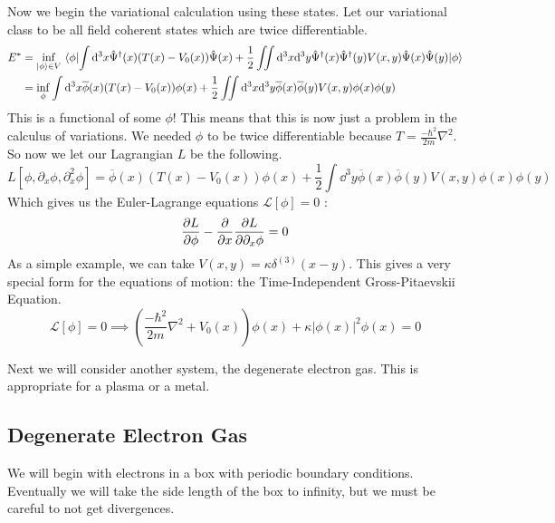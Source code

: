 \documentclass{article}
\begin{document}
Now we begin the variational calculation using these states. Let our variational class to be all field coherent states which are twice differentiable.
\begin{align}
E^* &= \inf_{\ket{\phi}\in V} \expval{\int \dd^3 x \hat\Psi^\dagger(x)(T(x)-V_0(x))\hat\Psi(x) + \frac{1}{2}\iint\dd^3 x \dd^3 y \hat\Psi^\dagger(x)\hat\Psi^\dagger(y)V(x,y)\hat\Psi(x)\hat\Psi(y)}{\phi}\\
&= \inf_{\phi}\int \dd^3 x\overline\phi(x) (T(x)-V_0(x))\phi(x)+\frac{1}{2} \iint \dd^3 x \dd^3 y \overline\phi(x)\overline\phi(y)V(x,y)\phi(x)\phi(y)
\end{align}
This is a functional of some $\phi$! This means that this is now just a problem in the calculus of variations. We needed $\phi$ to be twice differentiable because $T = \frac{-\hbar^2}{2m}\nabla^2$. So now we let our Lagrangian $L$ be the following.
\[L[\phi,\partial_x \phi, \partial_x^2 \phi] =\overline\phi(x) (T(x)-V_0(x))\phi(x)+\frac{1}{2} \int \dd^3 y \overline\phi(x)\overline\phi(y)V(x,y)\phi(x)\phi(y)\]
Which gives us the Euler-Lagrange equations $\mathcal{L}[\phi]=0$ :
\begin{equation}
\pdv{L}{\phi}-\pdv{x}\pdv{L}{\partial_x\phi} = 0
\end{equation}
As a simple example, we can take $V(x,y) = \kappa \delta^{(3)}(x-y)$. This gives a very special form for the equations of motion: the Time-Independent Gross-Pitaevskii Equation.
\begin{equation}
\mathcal{L}[\phi]=0\implies \left(\frac{-\hbar^2}{2m}\nabla^2 + V_0(x)\right)\phi(x) + \kappa|\phi(x)|^2 \phi(x)=0
\end{equation}

Next we will consider another system, the degenerate electron gas. This is appropriate for a plasma or a metal.

\subsection{Degenerate Electron Gas}
We will begin with electrons in a box with periodic boundary conditions. Eventually we will take the side length of the box to infinity, but we must be careful to not get divergences.
\end{document}
